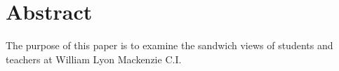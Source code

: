 \chapter*{Abstract}
The purpose of this paper is to examine the sandwich views of students and teachers at William Lyon Mackenzie C.I.
